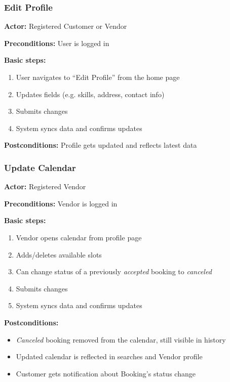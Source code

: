 \documentclass[11pt,a4paper]{article}
\begin{document}
\subsubsection{Edit Profile}

\textbf{Actor:} Registered Customer or Vendor

\noindent \textbf{Preconditions:} User is logged in

\noindent \textbf{Basic steps:}
\begin{enumerate}
  \item User navigates to ``Edit Profile'' from the home page
  \item Updates fields (e.g. skills, address, contact info)
  \item Submits changes
  \item System syncs data and confirms updates
\end{enumerate}

\noindent \textbf{Postconditions:} Profile gets updated and reflects latest data

\subsubsection{Update Calendar}

\textbf{Actor:} Registered Vendor

\noindent \textbf{Preconditions:} Vendor is logged in

\noindent \textbf{Basic steps:}
\begin{enumerate}
  \item Vendor opens calendar from profile page
  \item Adds/deletes available slots
  \item Can change status of a previously \textit{accepted} booking
    to \textit{canceled}
  \item Submits changes
  \item System syncs data and confirms updates
\end{enumerate}

\noindent \textbf{Postconditions:}
\begin{itemize}
  \item \textit{Canceled} booking removed from the calendar, still
    visible in history
  \item Updated calendar is reflected in searches and Vendor profile
  \item Customer gets notification about Booking's status change
\end{itemize}
\end{document}
